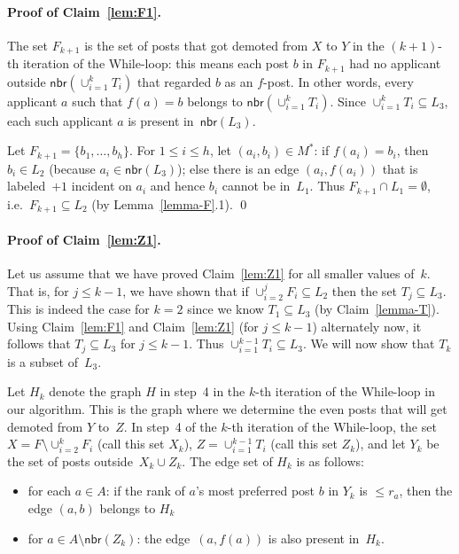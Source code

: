 \documentclass[11pt]{llncs}
\newcommand{\Nbr}{\mathsf{nbr}}
\begin{document}
\paragraph{Proof of Claim~\ref{lem:F1}.}
The set $F_{k+1}$ is the set of posts that got 
demoted from $X$ to $Y$ in the $(k+1)$-th iteration of the While-loop: this means each post $b$ 
in $F_{k+1}$ had no applicant outside $\Nbr(\cup_{i=1}^k T_i)$ that regarded $b$ as an $f$-post. 
In other words, every applicant $a$ such that $f(a) = b$ belongs to $\Nbr(\cup_{i=1}^k T_i)$. 
Since $\cup_{i=1}^k T_i \subseteq L_3$, each such applicant $a$ is present in~$\Nbr(L_3)$. 

\smallskip

Let $F_{k+1} = \{b_1,\ldots,b_h\}$. For $1 \le i \le h$, let $(a_i,b_i) \in M^*$: 
if $f(a_i) = b_i$, then $b_i \in L_2$ (because $a_i \in \Nbr(L_3)$); 
else there is an edge $(a_i,f(a_i))$ that is labeled~$+1$ incident on $a_i$ and hence $b_i$ 
cannot be in~$L_1$. Thus $F_{k+1} \cap L_1 = \emptyset$, i.e.\ $F_{k+1} \subseteq L_2$ (by 
Lemma~\ref{lemma-F}.1). \qed




\paragraph{Proof of Claim~\ref{lem:Z1}.}
Let us assume that we have proved Claim~\ref{lem:Z1} for all smaller values of~$k$. That is, for $j \le k-1$, we have
shown that if $\cup_{i=2}^j F_i \subseteq L_2$ then the set $T_j \subseteq L_3$. This is indeed the case for $k = 2$
since we know $T_1 \subseteq L_3$ (by Claim~\ref{lemma-T}).
Using Claim~\ref{lem:F1} and Claim~\ref{lem:Z1} (for $j \le k-1$) alternately now, it follows that 
$T_j \subseteq L_3$ for $j \le k-1$. Thus $\cup_{i=1}^{k-1}T_i \subseteq L_3$. We will now show that $T_k$ is a subset of~$L_3$.

\smallskip


Let $H_k$ denote the graph $H$ in step~4 in the $k$-th iteration of the While-loop in our 
algorithm. This is the graph where we determine the even posts that will get demoted from 
$Y$ to~$Z$. In step~4 of the $k$-th iteration of the While-loop, the set $X = F \setminus \cup_{i=2}^k F_i$ 
(call this set $X_k$), $Z = \cup_{i=1}^{k-1}T_i$ (call this set $Z_k$), and let $Y_k$ be the set of posts 
outside~$X_k \cup Z_k$. The edge set of $H_k$ is as follows: 
\begin{itemize}
\item for each $a \in A$: if the rank of $a$'s most preferred post $b$ in $Y_k$ is $\le r_a$, then the 
edge $(a,b)$ belongs to $H_k$
\item for $a \in A \setminus\Nbr(Z_k)$: the edge~$(a,f(a))$ is also present in~$H_k$.
\end{itemize}
\end{document}
